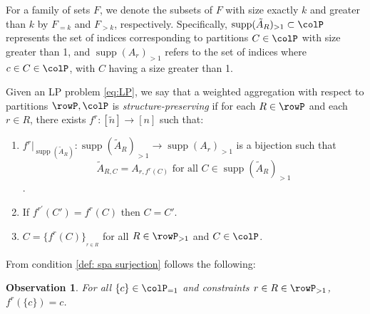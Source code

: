 \documentclass[smallextended,natbib]{svjour3}       %
\newtheorem{observation}[theorem]{Observation}
\DeclareMathOperator{\supp}{supp}
\numberwithin{definition}{section}
\numberwithin{theorem}{section}
\numberwithin{proposition}{section}
\begin{document}
For a family of sets \(F\), we denote the subsets of \(F\) with size exactly \(k\) and greater than \(k\) 
by \(F_{=k}\) and \(F_{>k}\), respectively. 
Specifically, \(\supp(\tilde{A}_R)_{>1} \subset \colP\) represents the set of indices corresponding to partitions 
\(C \in \colP\) with size greater than 1, and \(\supp(A_r)_{>1}\) refers to the set of indices where 
\(c \in C \in \colP\), with \(C\) having a size greater than 1.

\begin{definition}

  \label{def:structure preserving aggregation}
  Given an LP problem \eqref{eq:LP}, we say that a weighted aggregation with respect to partitions \(\rowP, \colP\) is \emph{structure-preserving} if for each \(R \in \rowP\) and each \(r \in R\), there exists \(f^r: [\tilde{n}] \to [n]\)  such that:
  \begin{enumerate}
    \item \label{def:spa bijection}\( f^r|_{\supp(\tilde{A}_{R})}: \supp(\tilde{A}_{R})_{>1} \to \supp(A_{r})_{>1}\) is a bijection such that
    \[\tilde{A}_{R,C} = A_{r,f^r(C)} \text{ for all } C \in \supp(\tilde{A}_{R})_{>1}\].
    \item \label{def: spa injection} If \(f^{r'}(C') = f^r(C)\) then \( C=C'\).
    \item \label{def: spa surjection} \(C = \{f^r(C)\}_{_{r\in R}}\) for all \(R \in \rowP_{>1}\) and \(C \in \colP\). %
  \end{enumerate}
\end{definition}
From condition \ref{def: spa surjection} follows the following:
\begin{observation}
  For all \(\{c\}\in \colP_{=1}\) and constraints \(r \in R \in \rowP_{>1}\), \(f^r(\{c\})= c\).
\end{observation}
\end{document}
